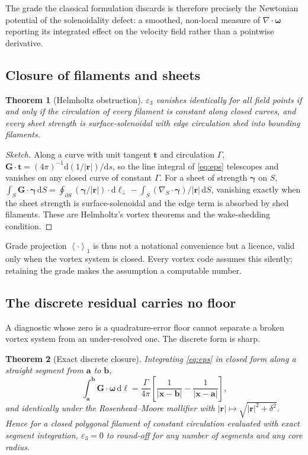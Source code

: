 \documentclass[preprint,12pt,3p]{elsarticle}
\newtheorem{theorem}{Theorem}
\theoremstyle{remark}
\newcommand{\grade}[2]{\left\langle #1 \right\rangle_{#2}}
\newcommand{\eps}{\varepsilon_3}
\newcommand{\dd}{\mathrm{d}}
\newcommand{\bx}{\mathbf{x}}
\newcommand{\br}{\mathbf{r}}
\newcommand{\bG}{\mathbf{G}}
\newcommand{\bomega}{\boldsymbol{\omega}}
\newcommand{\bgamma}{\boldsymbol{\gamma}}
\begin{document}
The grade the classical formulation discards is therefore precisely the
Newtonian potential of the solenoidality defect: a smoothed, non-local measure
of $\nabla\cdot\bomega$ reporting its integrated effect on the velocity field
rather than a pointwise derivative.

\subsection{Closure of filaments and sheets}

\begin{theorem}[Helmholtz obstruction]
\label{thm:B}
$\eps$ vanishes identically for all field points if and only if the circulation
of every filament is constant along closed curves, and every sheet strength is
surface-solenoidal with edge circulation shed into bounding filaments.
\end{theorem}

\begin{proof}[Sketch]
Along a curve with unit tangent $\mathbf{t}$ and circulation $\Gamma$,
$\bG\cdot\mathbf{t} = (4\pi)^{-1}\dd(1/|\br|)/\dd s$, so the line integral of
\eqref{eq:eps} telescopes and vanishes on any closed curve of constant $\Gamma$.
For a sheet of strength $\bgamma$ on $S$,
$\int_S\bG\cdot\bgamma\,\dd S
 = \oint_{\partial S}(\bgamma/|\br|)\cdot\dd\boldsymbol{\ell}_\perp
 - \int_S(\nabla_S\!\cdot\bgamma)/|\br|\,\dd S$,
vanishing exactly when the sheet strength is surface-solenoidal and the edge
term is absorbed by shed filaments. These are Helmholtz's vortex theorems and
the wake-shedding condition.
\end{proof}

Grade projection $\grade{\cdot}{1}$ is thus not a notational convenience but a
licence, valid only when the vortex system is closed. Every vortex code assumes
this silently; retaining the grade makes the assumption a computable number.

\subsection{The discrete residual carries no floor}

A diagnostic whose zero is a quadrature-error floor cannot separate a broken
vortex system from an under-resolved one. The discrete form is sharp.

\begin{theorem}[Exact discrete closure]
\label{thm:Bprime}
Integrating \eqref{eq:eps} in closed form along a straight segment from
$\mathbf{a}$ to $\mathbf{b}$,
\begin{equation}
  \int_{\mathbf{a}}^{\mathbf{b}}\bG\cdot\bomega\,\dd\ell
  = \frac{\Gamma}{4\pi}\left[\frac{1}{|\bx-\mathbf{b}|}-\frac{1}{|\bx-\mathbf{a}|}\right],
  \label{eq:telescope}
\end{equation}
and identically under the Rosenhead--Moore mollifier with
$|\br|\mapsto\sqrt{|\br|^2+\delta^2}$. Hence for a closed polygonal filament of
constant circulation evaluated with exact segment integration, $\eps=0$ to
round-off for any number of segments and any core radius.
\end{theorem}
\end{document}
